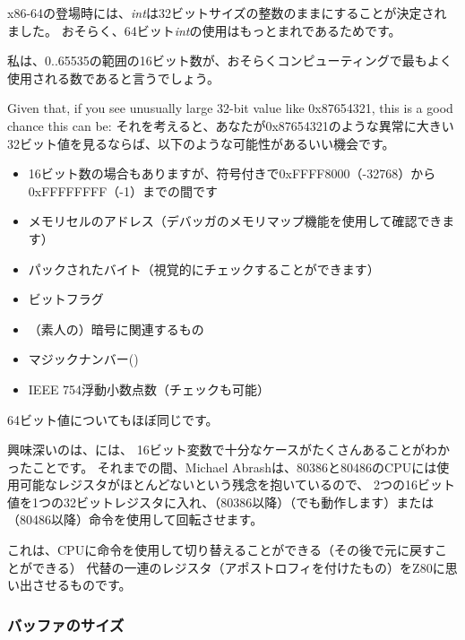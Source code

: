 x86-64の登場時には、\emph{int}は32ビットサイズの整数のままにすることが決定されました。
おそらく、64ビット\emph{int}の使用はもっとまれであるためです。

私は、0..65535の範囲の16ビット数が、おそらくコンピューティングで最もよく使用される数であると言うでしょう。

Given that, if you see unusually large 32-bit value like 0x87654321, this is a good chance this can be:
それを考えると、あなたが0x87654321のような異常に大きい32ビット値を見るならば、以下のような可能性があるいい機会です。

\begin{itemize}

\item 16ビット数の場合もありますが、符号付きで0xFFFF8000（-32768）から0xFFFFFFFF（-1）までの間です
\item メモリセルのアドレス（デバッガのメモリマップ機能を使用して確認できます）
\item パックされたバイト（視覚的にチェックすることができます）
\item ビットフラグ
\item （素人の）暗号に関連するもの
\item マジックナンバー()
\item IEEE 754浮動小数点数（チェックも可能）

\end{itemize}

64ビット値についてもほぼ同じです。


興味深いのは、には、
16ビット変数で十分なケースがたくさんあることがわかったことです。 
それまでの間、Michael Abrashは、80386と80486のCPUには使用可能なレジスタがほとんどないという残念を抱いているので、
2つの16ビット値を1つの32ビットレジスタに入れ、（80386以降）（でも動作します）または
（80486以降）命令を使用して回転させます。

これは、CPUに命令を使用して切り替えることができる（その後で元に戻すことができる）
代替の一連のレジスタ（アポストロフィを付けたもの）をZ80に思い出させるものです。

\subsubsection{バッファのサイズ}

